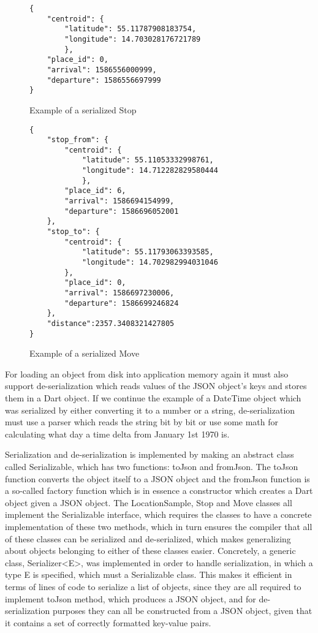\begin{figure}
    \centering
\begin{verbatim}
{
    "centroid": {
        "latitude": 55.11787908183754,
        "longitude": 14.703028176721789
        },
    "place_id": 0,
    "arrival": 1586556000999,
    "departure": 1586556697999
}
\end{verbatim}
    \caption{Example of a serialized Stop}
    \label{fig:serialized_stop}
\end{figure}

\begin{figure}
    \centering
\begin{verbatim}
{
    "stop_from": {
        "centroid": {
            "latitude": 55.11053332998761,
            "longitude": 14.712282829580444
            },
        "place_id": 6,
        "arrival": 1586694154999,
        "departure": 1586696052001
    },
    "stop_to": {
        "centroid": {
            "latitude": 55.11793063393585,
            "longitude": 14.702982994031046
        },
        "place_id": 0,
        "arrival": 1586697230006,
        "departure": 1586699246824
    },
    "distance":2357.3408321427805
}
\end{verbatim}
    \caption{Example of a serialized Move}
    \label{fig:serialized_move}
\end{figure}


For loading an object from disk into application memory again it must also support de-serialization which reads values of the JSON object's keys and stores them in a Dart object. If we continue the example of a DateTime object which was serialized by either converting it to a number or a string, de-serialization must use a parser which reads the string bit by bit or use some math for calculating what day a time delta from January 1st 1970 is. 

Serialization and de-serialization is implemented by making an abstract class called Serializable, which has two functions: toJson and fromJson. The toJson function converts the object itself to a JSON object and the fromJson function is a so-called factory function which is in essence a constructor which creates a Dart object given a JSON object. The LocationSample, Stop and Move classes all implement the Serializable interface, which requires the classes to have a concrete implementation of these two methods, which in turn ensures the compiler that all of these classes can be serialized and de-serialized, which makes generalizing about objects belonging to either of these classes easier. Concretely, a generic class, Serializer<E>, was implemented in order to handle serialization, in which a type E is specified, which must a Serializable class. This makes it efficient in terms of lines of code to serialize a list of objects, since they are all required to implement toJson method, which produces a JSON object, and for de-serialization purposes they can all be constructed from a JSON object, given that it contains a set of correctly formatted key-value pairs.

